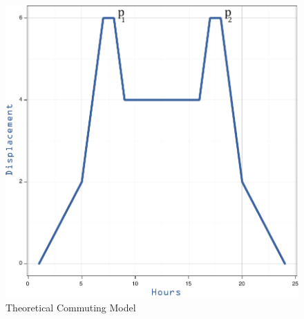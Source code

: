 \begin{figure}[h]
\begin{center}
\includegraphics[scale =0.6] {results/images/common_commuting_model.pdf}
\caption{Theoretical Commuting Model}
\label{fig:commuting}
\end{center}
\end{figure}

